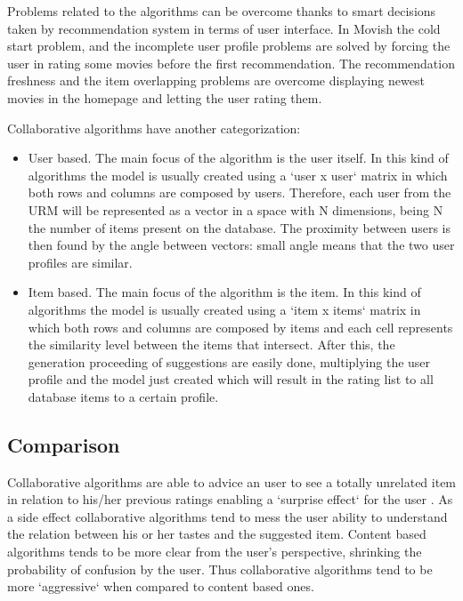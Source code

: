 Problems related to the algorithms can be overcome thanks to smart decisions taken by recommendation system in terms of user interface. In Movish the cold start problem, and the incomplete user profile problems are solved by forcing the user in rating some movies before the first recommendation. The recommendation freshness and the item overlapping problems are overcome displaying newest movies in the homepage and letting the user rating them.

Collaborative algorithms have another categorization:
\begin{itemize}
\item User based. The main focus of the algorithm is the user itself. In this kind of algorithms the model is usually created using a `user x user` matrix in which both rows and columns are composed by users. Therefore, each user from the URM will be represented as a vector in a space with N dimensions, being N the number of items present on the database.
The proximity between users is then found by the angle between vectors: small angle means that the two user profiles are similar.
\item Item based. The main focus of the algorithm is the item. In this kind of algorithms the model is usually created using a `item x items` matrix in which both  rows and columns are composed by items and each cell represents the similarity level between the items that intersect. After this, the generation proceeding of suggestions are easily done, multiplying the user profile and the model just created which will result in the rating list to all database items to a certain profile.
\end{itemize}

\subsection{Comparison}
\label{sec:Comparison}

Collaborative algorithms are able to advice an user to see a totally unrelated item in relation to his/her previous ratings enabling a `surprise effect` for the user \cite{evaluating-collaborative-filtering}. As a side effect collaborative algorithms tend to mess the user ability to understand the relation between his or her tastes and the suggested item. Content based algorithms tends to be more clear from the user's perspective, shrinking the probability of confusion by the user. Thus collaborative algorithms tend to be more `aggressive` when compared to content based ones.

